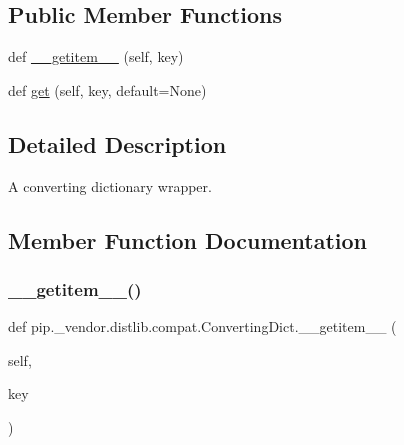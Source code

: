 \subsection*{Public Member Functions}
\begin{DoxyCompactItemize}
\item 
def \hyperlink{classpip_1_1__vendor_1_1distlib_1_1compat_1_1ConvertingDict_a79a3a5ae12f018cec5adbe30a0daecb5}{\+\_\+\+\_\+getitem\+\_\+\+\_\+} (self, key)
\item 
def \hyperlink{classpip_1_1__vendor_1_1distlib_1_1compat_1_1ConvertingDict_acc9b853aa7f196de678588c6234fa60c}{get} (self, key, default=None)
\end{DoxyCompactItemize}


\subsection{Detailed Description}
\begin{DoxyVerb}A converting dictionary wrapper.\end{DoxyVerb}
 

\subsection{Member Function Documentation}
\mbox{\label{classpip_1_1__vendor_1_1distlib_1_1compat_1_1ConvertingDict_a79a3a5ae12f018cec5adbe30a0daecb5}} 
\subsubsection{\texorpdfstring{\+\_\+\+\_\+getitem\+\_\+\+\_\+()}{\_\_getitem\_\_()}}
{\footnotesize\ttfamily def pip.\+\_\+vendor.\+distlib.\+compat.\+Converting\+Dict.\+\_\+\+\_\+getitem\+\_\+\+\_\+ (\begin{DoxyParamCaption}\item[{}]{self,  }\item[{}]{key }\end{DoxyParamCaption})}

